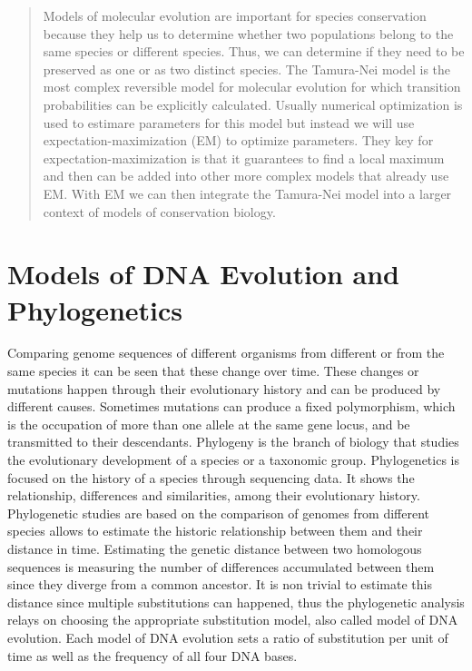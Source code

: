 \documentclass[12pt,twoside]{article}
\begin{document}
\begin{abstract}
Models of molecular evolution are important for species conservation because they help us to determine whether two populations belong to the same species or different species. Thus, we can determine if they need to be preserved as one or as two distinct species.
The Tamura-Nei model is the most complex reversible model for molecular evolution for which transition probabilities can be explicitly calculated. Usually numerical optimization is used to estimare parameters for this model but instead we will use expectation-maximization (EM) to optimize parameters. They key for expectation-maximization is that it guarantees to find a local maximum and then can be added into other more complex models that already use EM. With EM we can then integrate the Tamura-Nei model into a larger context of models of conservation biology.
\end{abstract}

\section{Models of DNA Evolution and Phylogenetics}
Comparing genome sequences of different organisms from different or from the same species it can be seen that these change over time. These changes or mutations happen through their evolutionary history and can be produced by different causes. Sometimes mutations can produce a fixed polymorphism, which is the occupation of more than one allele at the same gene locus, and be transmitted to their descendants.
Phylogeny is the branch of biology that studies the evolutionary development of a species or a taxonomic group. Phylogenetics is focused on the history of a species through sequencing data. It shows the relationship, differences and similarities, among their evolutionary history. Phylogenetic studies are based on the comparison of genomes from different species allows to estimate the historic relationship between them and their distance in time.
Estimating the genetic distance between two homologous sequences is measuring the number of differences accumulated between them since they diverge from a common ancestor. It is non trivial to estimate this distance since multiple substitutions can happened, thus the phylogenetic analysis relays on choosing the appropriate substitution model, also called model of DNA evolution. Each model of DNA evolution sets a ratio of substitution per unit of time as well as the frequency of all four DNA bases.
\end{document}
